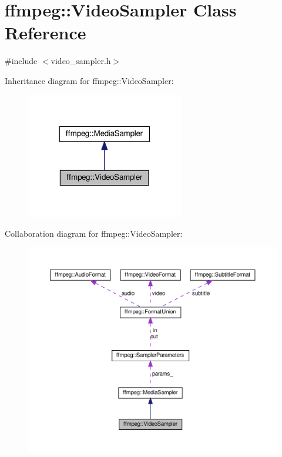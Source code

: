 \hypertarget{classffmpeg_1_1VideoSampler}{}\section{ffmpeg\+:\+:Video\+Sampler Class Reference}
\label{classffmpeg_1_1VideoSampler}


{\ttfamily \#include $<$video\+\_\+sampler.\+h$>$}



Inheritance diagram for ffmpeg\+:\+:Video\+Sampler\+:
\nopagebreak
\begin{figure}[H]
\begin{center}
\leavevmode
\includegraphics[width=195pt]{classffmpeg_1_1VideoSampler__inherit__graph}
\end{center}
\end{figure}


Collaboration diagram for ffmpeg\+:\+:Video\+Sampler\+:
\nopagebreak
\begin{figure}[H]
\begin{center}
\leavevmode
\includegraphics[width=350pt]{classffmpeg_1_1VideoSampler__coll__graph}
\end{center}
\end{figure}
